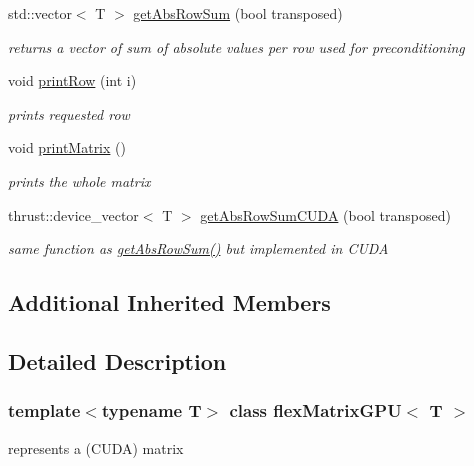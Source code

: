 \begin{DoxyCompactItemize}
std\+::vector$<$ T $>$ \hyperlink{classflex_matrix_g_p_u_a0a1f19c482243223b8d98165d0b44ccf}{get\+Abs\+Row\+Sum} (bool transposed)
\begin{DoxyCompactList}\small\item\em returns a vector of sum of absolute values per row used for preconditioning \end{DoxyCompactList}\item 
void \hyperlink{classflex_matrix_g_p_u_a8de9cdb55021d3c25c56daf9a081d487}{print\+Row} (int i)
\begin{DoxyCompactList}\small\item\em prints requested row \end{DoxyCompactList}\item 
\mbox{\label{classflex_matrix_g_p_u_a7717dbcb526b1a16f1a90a080880e42e}} 
void \hyperlink{classflex_matrix_g_p_u_a7717dbcb526b1a16f1a90a080880e42e}{print\+Matrix} ()
\begin{DoxyCompactList}\small\item\em prints the whole matrix \end{DoxyCompactList}\item 
thrust\+::device\+\_\+vector$<$ T $>$ \hyperlink{classflex_matrix_g_p_u_ab9fceb951d911794d4c70f5045255abd}{get\+Abs\+Row\+Sum\+C\+U\+DA} (bool transposed)
\begin{DoxyCompactList}\small\item\em same function as \hyperlink{classflex_matrix_g_p_u_a0a1f19c482243223b8d98165d0b44ccf}{get\+Abs\+Row\+Sum()} but implemented in C\+U\+DA \end{DoxyCompactList}\end{DoxyCompactItemize}
\subsection*{Additional Inherited Members}


\subsection{Detailed Description}
\subsubsection*{template$<$typename T$>$\newline
class flex\+Matrix\+G\+P\+U$<$ T $>$}

represents a (C\+U\+DA) matrix 


